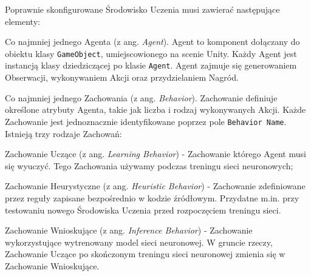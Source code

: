 Poprawnie skonfigurowane Środowisko Uczenia musi zawierać następujące elementy:
\begin{enumerate*}
\item Co najmniej jednego Agenta (z ang. \textit{Agent}). Agent to komponent dołączany do obiektu klasy \texttt{GameObject}, umiejscowionego na scenie Unity. Każdy Agent jest instancją klasy dziedziczącej po klasie \texttt{Agent}. Agent zajmuje się generowaniem Obserwacji, wykonywaniem Akcji oraz przydzielaniem Nagród.
\item Co najmniej jednego Zachowania (z ang. \textit{Behavior}). Zachowanie definiuje określone atrybuty Agenta, takie jak liczba i rodzaj wykonywanych Akcji. Każde Zachowanie jest jednoznacznie identyfikowane poprzez pole \texttt{Behavior Name}. \\
Istnieją trzy rodzaje Zachowań:
\begin{itemize*}
\item Zachowanie Uczące (z ang. \textit{Learning Behavior}) - Zachowanie którego Agent musi się wyuczyć. Tego Zachowania używamy podczas treningu sieci neuronowych;
\item Zachowanie Heurystyczne (z ang. \textit{Heuristic Behavior}) - Zachowanie zdefiniowane przez reguły zapisane bezpośrednio w kodzie źródłowym. Przydatne m.in. przy testowaniu nowego Środowiska Uczenia przed rozpoczęciem treningu sieci.
\item Zachowanie Wnioskujące (z ang. \textit{Inference Behavior}) - Zachowanie wykorzystujące wytrenowany model sieci neuronowej. W gruncie rzeczy, Zachowanie Uczące po skończonym treningu sieci neuronowej zmienia się w Zachowanie Wnioskujące.
\end{itemize*}
\end{enumerate*}

